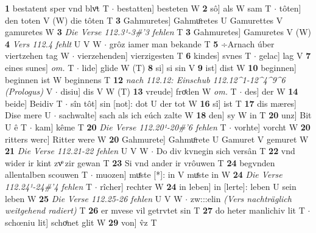\documentclass[8pt,a4paper,notitlepage]{article}
\begin{document}
\begin{table}[ht]
\begin{minipage}[t]{0.5\linewidth}
\textbf{1} bestatent sper vnd blvͦt T  $\cdot$ bestatten] besteten W \textbf{2} sô] als W sam T  $\cdot$ tôten] den toten V (W) die tôten T \textbf{3} Gahmuretes] Gahmuͦretes U Gamurettes V gamuretes W \textbf{3} \textit{Die Verse 112.3¹-3#'3 fehlen} T  \textbf{3} Gahmuretes] Gamuretes V (W) \textbf{4} \textit{Vers 112.4 fehlt} U V W   $\cdot$ grôz iamer man bekande T \textbf{5} ÷Arnach úber viertzehen tag W  $\cdot$ vierzehenden] vierzigesten T \textbf{6} kindes] svnes T  $\cdot$ gelac] lag V \textbf{7} eines sunes] \textit{om.} T  $\cdot$ lide] glide W (T) \textbf{8} si] si sin V \textbf{9} ist] dist W \textbf{10} beginnen] beginnen ist W beginnens T \textbf{12} \textit{nach 112.12: Einschub 112.12\textasciicircum1-12\textasciicircum4\textasciicircum9\textasciicircum6 (Prologus)} V   $\cdot$ disiu] dis V W (T) \textbf{13} vreude] froͤden W \textit{om.} T  $\cdot$ des] der W \textbf{14} beide] Beidiv T  $\cdot$ sîn tôt] sin [not]: dot U der tot W \textbf{16} sî] ist T \textbf{17} dis mæres] Dise mere U  $\cdot$ sachwalte] sach als ich eúch zalte W \textbf{18} den] sy W in T \textbf{20} unz] Bit U ê T  $\cdot$ kam] kême T \textbf{20} \textit{Die Verse 112.20¹-20#'6 fehlen} T   $\cdot$ vorhte] vorcht W \textbf{20} ritters werc] Ritter were W \textbf{20} Gahmurete] Gahmuͦrete U Gamuret V gemuret W \textbf{21} \textit{Die Verse 112.21-22 fehlen} U V W   $\cdot$ Do div kvnegin sich versân T \textbf{22} vnd wider ir kint zvͦ zir gewan T \textbf{23} Si vnd ander ir vrôuwen T \textbf{24} begvnden allentalben scouwen T  $\cdot$ muozen] muͤste [*]: in V muͤste in W \textbf{24} \textit{Die Verse 112.24¹-24#'4 fehlen} T   $\cdot$ rîcher] rechter W \textbf{24} in leben] in [lerte]: leben U sein leben W \textbf{25} \textit{Die Verse 112.25-26 fehlen} U V W   $\cdot$ zw:::elin \textit{(Vers nachträglich weitgehend radiert)} T \textbf{26} er mvese vil getrvtet sin T \textbf{27} do heter manlichiv lit T  $\cdot$ schœniu lit] schoͤnet glit W \textbf{29} von] v̂z T \newline
\end{minipage}
\end{table}
\end{document}
